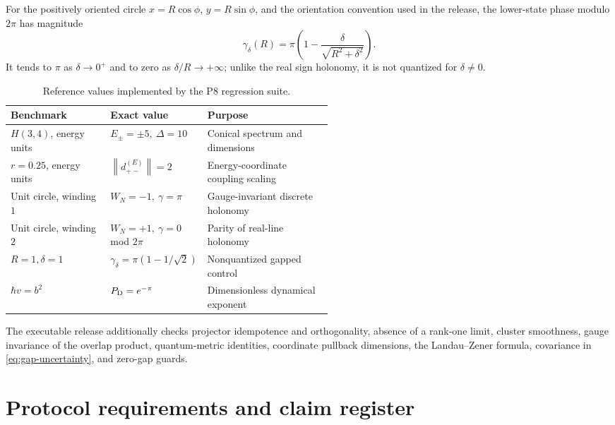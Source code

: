 \documentclass[11pt,a4paper]{article}
\theoremstyle{definition}
\theoremstyle{plain}
\theoremstyle{remark}
\newcommand{\norm}[1]{\left\lVert #1\right\rVert}
\begin{document}
For the positively oriented circle \(x=R\cos\phi\),
\(y=R\sin\phi\), and the orientation convention used in the release,
the lower-state phase modulo \(2\pi\) has magnitude
\begin{equation}\label{eq:gapped-berry}
\gamma_\delta(R)
=\pi\left(1-\frac{\delta}{\sqrt{R^2+\delta^2}}\right).
\end{equation}
It tends to \(\pi\) as \(\delta\to0^+\) and to zero as
\(\delta/R\to+\infty\); unlike the real sign holonomy, it is not
quantized for \(\delta\ne0\).

\begin{table}[ht]
\centering
\small
\begin{tabularx}{\linewidth}{L{0.31\linewidth} L{0.22\linewidth} Y}
\toprule
Benchmark & Exact value & Purpose \\
\midrule
\(H(3,4)\), energy units & \(E_\pm=\pm5,\ \Delta=10\) &
Conical spectrum and dimensions \\
\(r=0.25\), energy units & \(\norm{d_{+-}^{(E)}}=2\) &
Energy-coordinate coupling scaling \\
Unit circle, winding \(1\) & \(W_N=-1,\ \gamma=\pi\) &
Gauge-invariant discrete holonomy \\
Unit circle, winding \(2\) & \(W_N=+1,\ \gamma=0\) mod \(2\pi\) &
Parity of real-line holonomy \\
\(R=1,\delta=1\) & \(\gamma_\delta=\pi(1-1/\sqrt2)\) &
Nonquantized gapped control \\
\(\hbar v=b^2\) & \(P_{\rm D}=e^{-\pi}\) &
Dimensionless dynamical exponent \\
\bottomrule
\end{tabularx}
\caption{Reference values implemented by the P8 regression suite.}
\end{table}

The executable release additionally checks projector idempotence and
orthogonality, absence of a rank-one limit, cluster smoothness,
gauge invariance of the overlap product, quantum-metric identities,
coordinate pullback dimensions, the Landau--Zener formula, covariance
in \cref{eq:gap-uncertainty}, and zero-gap guards.

\section{Protocol requirements and claim register}
\end{document}
